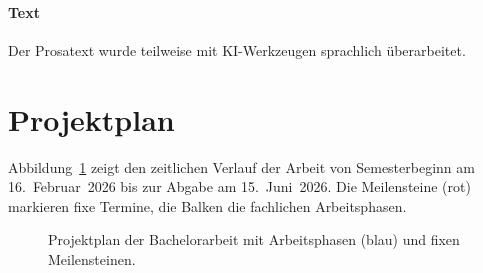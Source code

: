 \paragraph{Text}
Der Prosatext wurde teilweise mit KI-Werkzeugen sprachlich überarbeitet.

\section{Projektplan}
\label{sec:projektplan}

Abbildung~\ref{fig:projektplan} zeigt den zeitlichen Verlauf der Arbeit von Semesterbeginn am 16.~Februar~2026 bis zur Abgabe am 15.~Juni~2026. Die Meilensteine (rot) markieren fixe Termine, die Balken die fachlichen Arbeitsphasen.

\begin{figure}[H]
\centering
\resizebox{\textwidth}{!}{%
%
}
\caption{Projektplan der Bachelorarbeit mit Arbeitsphasen (blau) und fixen Meilensteinen.}
\label{fig:projektplan}
\end{figure}
